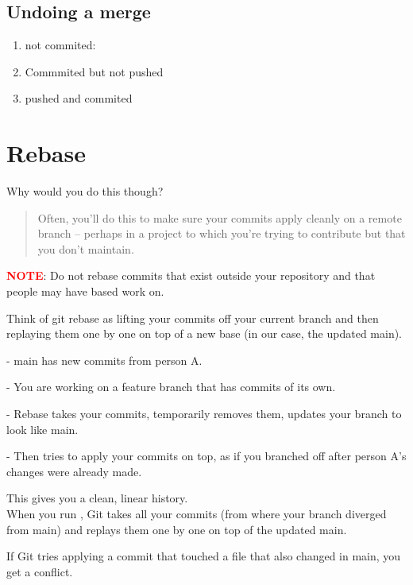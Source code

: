 \subsection{Undoing a merge}
\begin{enumerate}
    \item not commited: 
    \item Commmited but not pushed 
    \item pushed and commited 
\end{enumerate}

\section{Rebase}
Why would you do this though?
\begin{quote}
    Often, you'll do this to make sure your commits apply cleanly on a remote branch -- perhaps in a project to which you're trying to contribute but that you don't maintain.
\end{quote}

\begin{tcolorbox}[infoBox]
        \textcolor{red}{\textbf{NOTE}}: Do not rebase commits that exist outside your repository and that people may have based work on.
\end{tcolorbox}

Think of git rebase as lifting your commits off your current branch and then replaying them one by one on top of a new base (in our case, the updated main).

- main has new commits from person A.

- You are working on a feature branch that has commits of its own.

- Rebase takes your commits, temporarily removes them, updates your branch to look like main.

- Then tries to apply your commits on top, as if you branched off after person A's changes were already made.

This gives you a clean, linear history.\\

When you run , Git takes all your commits (from where your branch diverged from main) and replays them one by one on top of the updated main.

If Git tries applying a commit that touched a file that also changed in main, you get a conflict.


